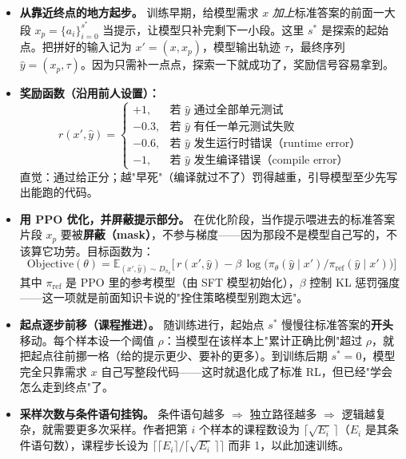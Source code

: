 \documentclass[11pt,UTF8,fontset=fandol]{ctexart}
\begin{document}
\begin{itemize}[leftmargin=2em]
\item \textbf{从靠近终点的地方起步。} 训练早期，给模型需求 $x$ \emph{加上}标准答案的前面一大段 $x_p = \{a_i\}_{i=0}^{s^*}$ 当提示，让模型只补完剩下一小段。这里 $s^*$ 是探索的起始点。把拼好的输入记为 $x' = (x, x_p)$，模型输出轨迹 $\tau$，最终序列 $\hat{y} = (x_p, \tau)$。因为只需补一点点，探索一下就成功了，奖励信号容易拿到。
\item \textbf{奖励函数（沿用前人设置）：}
\begin{equation*}
r(x', \hat{y}) =
\begin{cases}
+1, & \text{若 } \hat{y} \text{ 通过全部单元测试}\\
-0.3, & \text{若 } \hat{y} \text{ 有任一单元测试失败}\\
-0.6, & \text{若 } \hat{y} \text{ 发生运行时错误（runtime error）}\\
-1, & \text{若 } \hat{y} \text{ 发生编译错误（compile error）}
\end{cases}
\tag{3}
\end{equation*}
直觉：通过给正分；越"早死"（编译就过不了）罚得越重，引导模型至少先写出能跑的代码。
\item \textbf{用 PPO 优化，并屏蔽提示部分。} 在优化阶段，当作提示喂进去的标准答案片段 $x_p$ 要被\textbf{屏蔽（mask）}，不参与梯度——因为那段不是模型自己写的，不该算它功劳。目标函数为：
\begin{equation*}
\mathrm{Objective}(\theta) = \mathbb{E}_{(x',\hat{y})\sim D_{\pi_\theta}}\big[\, r(x', \hat{y}) - \beta\,\log\big(\pi_\theta(\hat{y}\mid x') / \pi_{\mathrm{ref}}(\hat{y}\mid x')\big)\big]
\tag{4}
\end{equation*}
其中 $\pi_{\mathrm{ref}}$ 是 PPO 里的参考模型（由 SFT 模型初始化），$\beta$ 控制 KL 惩罚强度——这一项就是前面知识卡说的"拴住策略模型别跑太远"。
\item \textbf{起点逐步前移（课程推进）。} 随训练进行，起始点 $s^*$ 慢慢往标准答案的\textbf{开头}移动。每个样本设一个阈值 $\rho$：当模型在该样本上"累计正确比例"超过 $\rho$，就把起点往前挪一格（给的提示更少、要补的更多）。到训练后期 $s^* = 0$，模型完全只靠需求 $x$ 自己写整段代码——这时就退化成了标准 RL，但已经"学会怎么走到终点"了。
\item \textbf{采样次数与条件语句挂钩。} 条件语句越多 $\Rightarrow$ 独立路径越多 $\Rightarrow$ 逻辑越复杂，就需要更多次采样。作者把第 $i$ 个样本的课程数设为 $\lceil \sqrt{E_i}\, \rceil$（$E_i$ 是其条件语句数），课程步长设为 $\lceil \lceil E_i \rceil / \lceil \sqrt{E_i}\,\rceil \rceil$ 而非 1，以此加速训练。
\end{itemize}
\end{document}
